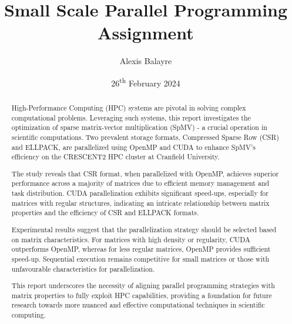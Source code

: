 \documentclass[12pt,oneside]{book} %
\title{Small Scale Parallel Programming Assignment}
\author{Alexis Balayre}
\date{26\textsuperscript{th} February 2024}
\begin{document}
\frontmatter

\maketitle

\begin{abstract}

    High-Performance Computing (HPC) systems are pivotal in solving complex
    computational problems. Leveraging such systems, this report investigates the
    optimization of sparse matrix-vector multiplication (SpMV) - a crucial
    operation in scientific computations. Two prevalent storage formats, Compressed
    Sparse Row (CSR) and ELLPACK, are parallelized using OpenMP and CUDA to enhance
    SpMV's efficiency on the CRESCENT2 HPC cluster at Cranfield University.

    The study reveals that CSR format, when parallelized with OpenMP, achieves
    superior performance across a majority of matrices due to efficient memory
    management and task distribution. CUDA parallelization exhibits significant
    speed-ups, especially for matrices with regular structures, indicating an
    intricate relationship between matrix properties and the efficiency of CSR and
    ELLPACK formats.

    Experimental results suggest that the parallelization strategy should be
    selected based on matrix characteristics. For matrices with high density or
    regularity, CUDA outperforms OpenMP, whereas for less regular matrices, OpenMP
    provides sufficient speed-up. Sequential execution remains competitive for
    small matrices or those with unfavourable characteristics for parallelization.

    This report underscores the necessity of aligning parallel programming
    strategies with matrix properties to fully exploit HPC capabilities, providing
    a foundation for future research towards more nuanced and effective
    computational techniques in scientific computing.

\end{abstract}

{
\clearpage
\singlespacing
{
    \tableofcontents
}
\clearpage

\listoffigures

\listoftables
}

\mainmatter
\pagestyle{fancy}
\fancyhead[L]{\nouppercase{\leftmark}}
\fancyhead[R]{\nouppercase{\rightmark}}
\end{document}

